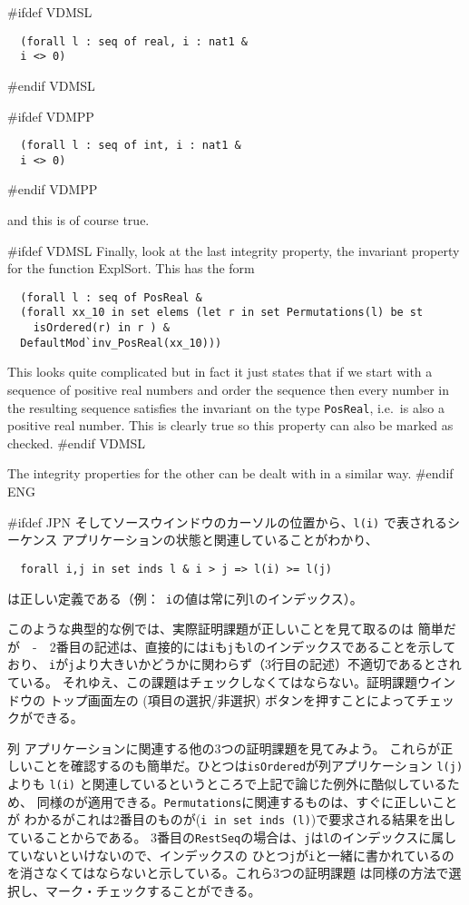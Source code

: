 \documentclass[\pformat,12pt]{article}
\newcommand{\aaa}{\tt }
\newcommand{\guicmd}[1]{{\sf #1}}
\newcommand{\guicmd}[1]{{\gt #1}}
\begin{document}
#ifdef VDMSL
\begin{verbatim}
  (forall l : seq of real, i : nat1 &
  i <> 0)
\end{verbatim}
#endif VDMSL

#ifdef VDMPP
\begin{verbatim}
  (forall l : seq of int, i : nat1 &
  i <> 0)
\end{verbatim}
#endif VDMPP

and this is of course true.

#ifdef VDMSL
Finally, look at the last integrity property, the invariant property
for the function \guicmd{ExplSort}. This has the form
\begin{verbatim}
  (forall l : seq of PosReal &
  (forall xx_10 in set elems (let r in set Permutations(l) be st 
    isOrdered(r) in r ) &
  DefaultMod`inv_PosReal(xx_10)))
\end{verbatim}

This looks quite complicated but in fact it just states that if we
start with a sequence of positive real numbers and order the sequence
then every number in the resulting sequence satisfies the invariant on
the type {\aaa PosReal}, i.e.\ is also a positive real number. This is
clearly true so this property can also be marked as checked.
#endif VDMSL

The integrity properties for the other
 can be dealt with in
a similar way.
#endif ENG

#ifdef JPN
そして\guicmd{ソースウインドウ}のカーソルの位置から、\verb+l(i)+ で表されるシーケンス
 アプリケーションの状態と関連していることがわかり、

\begin{verbatim}
  forall i,j in set inds l & i > j => l(i) >= l(j)
\end{verbatim}

は正しい定義である（例：\ {\aaa i}の値は常に列{\aaa l}のインデックス）。

このような典型的な例では、実際証明課題が正しいことを見て取るのは
簡単だが　-　2番目の記述は、直接的には{\aaa i}も{\aaa j}も{\aaa l}のインデックスであることを示しており、
{\aaa i}が{\aaa j}より大きいかどうかに関わらず（3行目の記述）不適切であるとされている。
それゆえ、この課題はチェックしなくてはならない。\guicmd{証明課題ウインドウ}の
トップ画面左の 
(\guicmd{項目の選択/非選択}) ボタンを押すことによってチェックができる。

列 アプリケーションに関連する他の3つの証明課題を見てみよう。
これらが正しいことを確認するのも簡単だ。ひとつは{\aaa isOrdered}が列アプリケーション
\verb+l(j)+ よりも \verb+l(i)+ と関連しているというところで上記で論じた例外に酷似しているため、
同様のが適用できる。{\aaa Permutations}に関連するものは、すぐに正しいことが
わかるがこれは2番目のものが(\verb+i in set inds (l)+)で要求される結果を出していることからである。
3番目の{\aaa RestSeq}の場合は、{\aaa j}は{\aaa l}のインデックスに属していないといけないので、インデックスの
ひとつ{\aaa j}が{\aaa i}と一緒に書かれているのを消さなくてはならないと示している。これら3つの証明課題
は同様の方法で選択し、マーク・チェックすることができる。
\end{document}
